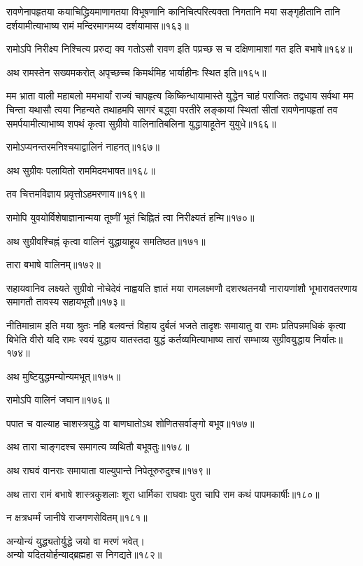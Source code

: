 \begin{flushleft}

रावणेनापहृतया कयाचिद्ध्रियमाणागतया विभूषणानि कानिचित्परित्यक्ता निगतानि मया सङ्गृहीतानि तानि दर्शयामीत्याभाष्य रामं मन्दिरमागमय्य दर्शयामास॥१६३॥

रामोऽपि निरीक्ष्य निश्चित्य प्ररुद्य क्व गतोऽसौ रावण इति पप्रच्छ स च दक्षिणामाशां गत इति बभाषे॥१६४॥

अथ रामस्तेन सख्यमकरोत् अपृच्छच्च किमर्थमिह भार्याहीनः स्थित इति॥१६५॥


मम भ्राता वाली महाबलो ममभार्यां राज्यं चापहृत्य किष्किन्धायामास्ते युद्धेन चाहं पराजितः तद्वधाय सर्वथा मम चिन्ता यथासौ त्वया निहन्यते तथाहमपि सागरं बद्ध्वा परतीरे लङ्कायां स्थितां सीतां रावणेनापहृतां तव समर्पयामीत्याभाष्य शपथं कृत्वा सुग्रीवो वालिनातिबलिना युद्धायाहूतेन युयुधे॥१६६॥

रामोऽप्यनन्तरमनिश्चयाद्वालिनं नाहनत्॥१६७॥

अथ सुग्रीवः पलायितो राममिदमभाषत॥१६८॥

तव चित्तमविज्ञाय प्रवृत्तोऽहमरणाय॥१६९॥

रामोपि युवयोर्विशेषाज्ञानान्मया तूष्णीं भूतं चिह्नितं त्वा निरीक्ष्यतं हन्मि॥१७०॥

अथ सुग्रीवश्चिह्नं कृत्वा वालिनं युद्धायाहूय समतिष्ठत॥१७१॥

तारा बभाषे वालिनम्॥१७२॥

सहायवानिव लक्ष्यते सुग्रीवो नोचेदेवं नाह्वयति ज्ञातं मया रामलक्ष्मणौ दशरथतनयौ नारायणांशौ भूभारावतरणाय समागतौ तावस्य सहायभूतौ॥१७३॥


नीतिमान्राम इति मया श्रुतः नहि बलवन्तं विहाय दुर्बलं भजते तादृशः समायातु वा रामः प्रतिपन्नमधिकं कृत्वा बिभेति वीरो यदि रामः स्वयं युद्धाय यातस्तदा युद्धं कर्तव्यमित्याभाष्य तारां सम्भाव्य सुग्रीवयुद्धाय निर्यातः॥१७४॥

अथ मुष्टियुद्धमन्योन्यमभूत्॥१७५॥

रामोऽपि वालिनं जघान॥१७६॥

पपात च वाल्याह चाशस्त्रयुद्धे वा बाणघातोऽथ शोणितसर्वाङ्गो बभूव॥१७७॥

अथ तारा चाङ्गदश्च समागत्य व्यथितौ बभूवतुः॥१७८॥

अथ राघवं वानराः समायाता वाल्युपान्ते निपेतूरुरुदुश्च॥१७९॥

अथ तारा रामं बभाषे शास्त्रकुशलाः शूरा धार्मिका राघवाः पुरा चापि राम कथं पापमकार्षीः॥१८०॥

न क्षत्रधर्म्मं जानीषे राजगणसेवितम्॥१८१॥

अन्योन्यं युद्ध्यतोर्युद्धे जयो वा मरणं भवेत्।\\
अन्यो यदितयोर्हन्याद्ब्रह्महा स निगद्यते॥१८२॥


\end{flushleft}
